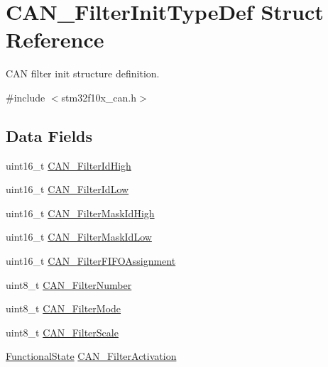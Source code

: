 \hypertarget{struct_c_a_n___filter_init_type_def}{}\section{C\+A\+N\+\_\+\+Filter\+Init\+Type\+Def Struct Reference}
\label{struct_c_a_n___filter_init_type_def}


C\+AN filter init structure definition.  




{\ttfamily \#include $<$stm32f10x\+\_\+can.\+h$>$}

\subsection*{Data Fields}
\begin{DoxyCompactItemize}
\item 
uint16\+\_\+t \mbox{\hyperlink{struct_c_a_n___filter_init_type_def_ac1368e531f4dd6ff08445ae664a9b96c}{C\+A\+N\+\_\+\+Filter\+Id\+High}}
\item 
uint16\+\_\+t \mbox{\hyperlink{struct_c_a_n___filter_init_type_def_a3ca3a0b0d3b7617b8bb5bbb7d4ca23cf}{C\+A\+N\+\_\+\+Filter\+Id\+Low}}
\item 
uint16\+\_\+t \mbox{\hyperlink{struct_c_a_n___filter_init_type_def_a66d56c2f432920189ae4b046c325fba6}{C\+A\+N\+\_\+\+Filter\+Mask\+Id\+High}}
\item 
uint16\+\_\+t \mbox{\hyperlink{struct_c_a_n___filter_init_type_def_a3677d330355ee09293b3ee8c055b58a5}{C\+A\+N\+\_\+\+Filter\+Mask\+Id\+Low}}
\item 
uint16\+\_\+t \mbox{\hyperlink{struct_c_a_n___filter_init_type_def_a9581cf60f03a7c1edcd03de3783c8bf1}{C\+A\+N\+\_\+\+Filter\+F\+I\+F\+O\+Assignment}}
\item 
uint8\+\_\+t \mbox{\hyperlink{struct_c_a_n___filter_init_type_def_a4657eff323f0e2d379115fd06f5c8d74}{C\+A\+N\+\_\+\+Filter\+Number}}
\item 
uint8\+\_\+t \mbox{\hyperlink{struct_c_a_n___filter_init_type_def_a0fecca0da838d863a15294277db8f8fe}{C\+A\+N\+\_\+\+Filter\+Mode}}
\item 
uint8\+\_\+t \mbox{\hyperlink{struct_c_a_n___filter_init_type_def_a434a665b1a2781348818d285dd18b6d5}{C\+A\+N\+\_\+\+Filter\+Scale}}
\item 
\mbox{\hyperlink{group___exported__types_gac9a7e9a35d2513ec15c3b537aaa4fba1}{Functional\+State}} \mbox{\hyperlink{struct_c_a_n___filter_init_type_def_a193c0ae1b3982478eeca47470a1ee075}{C\+A\+N\+\_\+\+Filter\+Activation}}
\end{DoxyCompactItemize}


